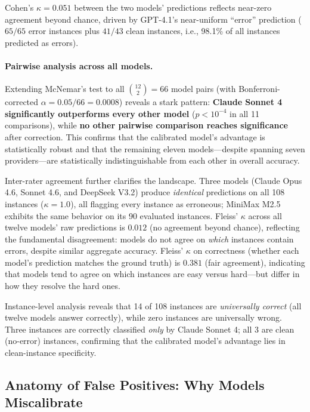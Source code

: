 \documentclass[11pt]{article}
\begin{document}
Cohen's $\kappa = 0.051$ between the two models' predictions reflects near-zero agreement beyond chance, driven by GPT-4.1's near-uniform ``error'' prediction ($65/65$ error instances plus $41/43$ clean instances, i.e., 98.1\% of all instances predicted as errors).

\paragraph{Pairwise analysis across all models.}
Extending McNemar's test to all $\binom{12}{2} = 66$ model pairs (with Bonferroni-corrected $\alpha = 0.05/66 = 0.0008$) reveals a stark pattern: \textbf{Claude Sonnet 4 significantly outperforms every other model} ($p < 10^{-4}$ in all 11 comparisons), while \textbf{no other pairwise comparison reaches significance} after correction.
This confirms that the calibrated model's advantage is statistically robust and that the remaining eleven models---despite spanning seven providers---are statistically indistinguishable from each other in overall accuracy.

Inter-rater agreement further clarifies the landscape.
Three models (Claude Opus 4.6, Sonnet 4.6, and DeepSeek V3.2) produce \emph{identical} predictions on all 108 instances ($\kappa = 1.0$), all flagging every instance as erroneous; MiniMax M2.5 exhibits the same behavior on its 90 evaluated instances.
Fleiss' $\kappa$ across all twelve models' raw predictions is $0.012$ (no agreement beyond chance), reflecting the fundamental disagreement: models do not agree on \emph{which} instances contain errors, despite similar aggregate accuracy.
Fleiss' $\kappa$ on correctness (whether each model's prediction matches the ground truth) is $0.381$ (fair agreement), indicating that models tend to agree on which instances are easy versus hard---but differ in how they resolve the hard ones.

Instance-level analysis reveals that 14 of 108 instances are \emph{universally correct} (all twelve models answer correctly), while zero instances are universally wrong.
Three instances are correctly classified \emph{only} by Claude Sonnet 4; all 3 are clean (no-error) instances, confirming that the calibrated model's advantage lies in clean-instance specificity.

\subsection{Anatomy of False Positives: Why Models Miscalibrate}
\label{sec:analysis:fp}
\end{document}
